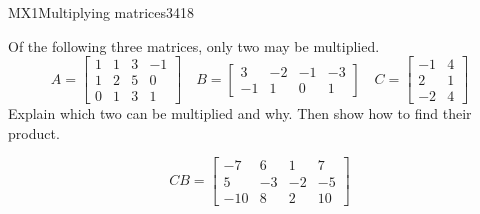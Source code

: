\begin{exercise}{MX1}{Multiplying matrices}{3418} 
\begin{exerciseStatement} 

Of the following three matrices, only two may be multiplied. \[
          A=\left[\begin{array}{cccc}
1 & 1 & 3 & -1 \\
1 & 2 & 5 & 0 \\
0 & 1 & 3 & 1
\end{array}\right] \hspace{1em} B=\left[\begin{array}{cccc}
3 & -2 & -1 & -3 \\
-1 & 1 & 0 & 1
\end{array}\right] \hspace{1em} C=\left[\begin{array}{cc}
-1 & 4 \\
2 & 1 \\
-2 & 4
\end{array}\right]
      \] Explain which two can be multiplied and why. Then show how to find their product.

 \end{exerciseStatement}
 \begin{exerciseAnswer} \[CB=\left[\begin{array}{cccc}
-7 & 6 & 1 & 7 \\
5 & -3 & -2 & -5 \\
-10 & 8 & 2 & 10
\end{array}\right]\] \end{exerciseAnswer}
 \end{exercise}


